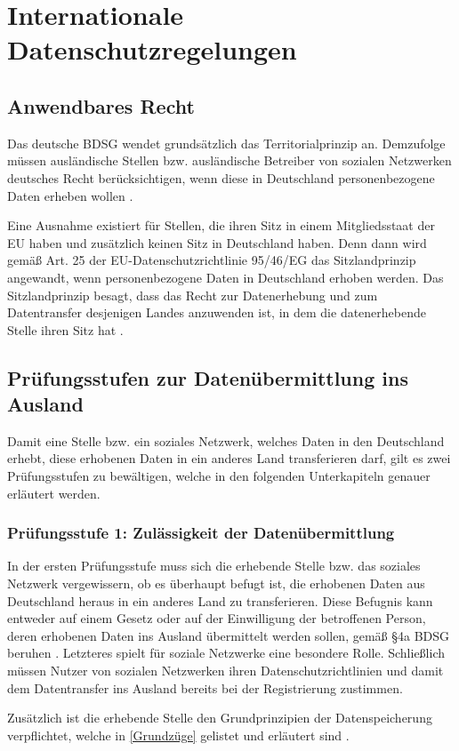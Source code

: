 


\chapter{Internationale Datenschutzregelungen}
\section{Anwendbares Recht}
Das deutsche \ac{BDSG} wendet grundsätzlich das Territorialprinzip an. Demzufolge müssen ausländische Stellen bzw. ausländische Betreiber von sozialen Netzwerken deutsches Recht berücksichtigen, wenn diese in Deutschland personenbezogene Daten erheben wollen \autocite[vgl.][]{ICS.2011}.
\par
Eine Ausnahme existiert für Stellen, die ihren Sitz in einem Mitgliedsstaat der \ac{EU} haben und zusätzlich keinen Sitz in Deutschland haben. Denn dann wird gemäß Art. 25 der EU-Datenschutzrichtlinie 95/46/EG das Sitzlandprinzip angewandt, wenn personenbezogene Daten in Deutschland erhoben werden. Das Sitzlandprinzip besagt, dass das Recht zur Datenerhebung und zum Datentransfer desjenigen Landes anzuwenden ist, in dem die datenerhebende Stelle ihren Sitz hat \autocite[vgl.][]{ICS.2011} \autocite[vgl.][]{EG.1995}.

\section{Prüfungsstufen zur Datenübermittlung ins Ausland}
Damit eine Stelle bzw. ein soziales Netzwerk, welches Daten in den Deutschland erhebt, diese erhobenen Daten in ein anderes Land transferieren darf, gilt es zwei Prüfungsstufen zu bewältigen, welche in den folgenden Unterkapiteln genauer erläutert werden.

\subsection{Prüfungsstufe 1: Zulässigkeit der Datenübermittlung}
In der ersten Prüfungsstufe muss sich die erhebende Stelle bzw. das soziales Netzwerk vergewissern, ob es überhaupt befugt ist, die erhobenen Daten aus Deutschland heraus in ein anderes Land zu transferieren. Diese Befugnis kann entweder auf einem Gesetz oder auf der Einwilligung der betroffenen Person, deren erhobenen Daten ins Ausland übermittelt werden sollen, gemäß §4a BDSG beruhen \autocite[vgl.][]{LDI.2017}. Letzteres spielt für soziale Netzwerke eine besondere Rolle. Schließlich müssen Nutzer von sozialen Netzwerken ihren Datenschutzrichtlinien und damit dem Datentransfer ins Ausland bereits bei der Registrierung zustimmen.
\par
Zusätzlich ist die erhebende Stelle den Grundprinzipien der Datenspeicherung verpflichtet, welche in \ref{Grundzüge} gelistet und erläutert sind \autocite[vgl.][]{LDI.2017}.

